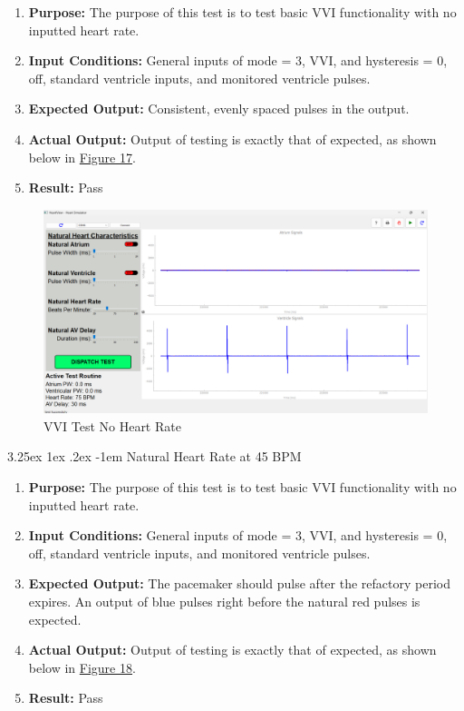 \documentclass{article}
\makeatletter
\renewcommand\paragraph{\@startsection{paragraph}{5}{\z@}%
  {3.25ex \@plus1ex \@minus.2ex}%
  {-1em}%
  {\normalfont\normalsize\bfseries}}
\makeatother
\begin{document}
\begin{enumerate}[label=]
   \item \textbf{Purpose:} The purpose of this test is to test basic VVI functionality with no inputted heart rate.
   \item \textbf{Input Conditions:} General inputs of mode = 3, VVI, and hysteresis = 0, off, standard ventricle 
   inputs, and monitored ventricle pulses.
   \item \textbf{Expected Output:} Consistent, evenly spaced pulses in the output.
   \item \textbf{Actual Output:} Output of testing is exactly that of expected, as shown below in \hyperref[VVItestnor]{Figure 17}.
   \item \textbf{Result:} Pass
\end{enumerate}

\begin{tcolorbox}
    \begin{figure}[H]\label{VVItestnor}
        \includegraphics[width=\textwidth]{VVItestnohr.png}
        \caption{VVI Test No Heart Rate}
    \end{figure}
\end{tcolorbox}

\newpage
\paragraph{Natural Heart Rate at 45 BPM}

\begin{enumerate}[label=]
   \item \textbf{Purpose:} The purpose of this test is to test basic VVI functionality with no inputted heart rate.
   \item \textbf{Input Conditions:} General inputs of mode = 3, VVI, and hysteresis = 0, off, standard ventricle 
   inputs, and monitored ventricle pulses.
   \item \textbf{Expected Output:} The pacemaker should pulse after the refactory period expires. An output of blue pulses right before the natural 
   red pulses is expected.
   \item \textbf{Actual Output:} Output of testing is exactly that of expected, as shown below in \hyperref[VVItest45]{Figure 18}.
   \item \textbf{Result:} Pass
\end{enumerate}
\end{document}
